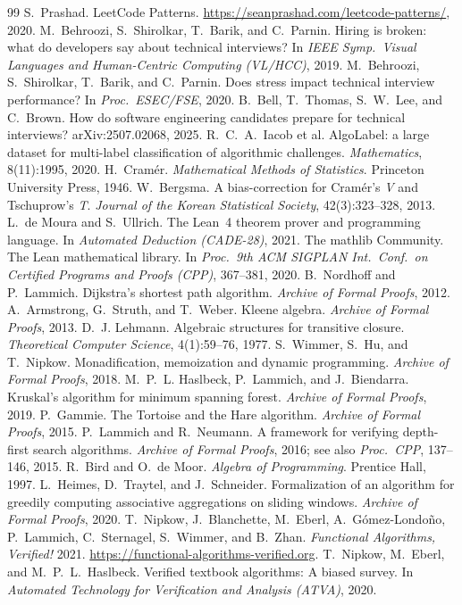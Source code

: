 \documentclass[11pt]{article}
\begin{document}
\begin{thebibliography}{99}
 S.~Prashad. LeetCode Patterns. \url{https://seanprashad.com/leetcode-patterns/}, 2020.
 M.~Behroozi, S.~Shirolkar, T.~Barik, and C.~Parnin. Hiring is broken:
what do developers say about technical interviews? In \emph{IEEE Symp.\ Visual Languages and
Human-Centric Computing (VL/HCC)}, 2019.
 M.~Behroozi, S.~Shirolkar, T.~Barik, and C.~Parnin. Does stress impact
technical interview performance? In \emph{Proc.\ ESEC/FSE}, 2020.
 B.~Bell, T.~Thomas, S.~W.~Lee, and C.~Brown. How do software engineering
candidates prepare for technical interviews? arXiv:2507.02068, 2025.
 R.~C.~A.~Iacob et al. AlgoLabel: a large dataset for multi-label
classification of algorithmic challenges. \emph{Mathematics}, 8(11):1995, 2020.
 H.~Cram\'er. \emph{Mathematical Methods of Statistics}. Princeton
University Press, 1946.
 W.~Bergsma. A bias-correction for Cram\'er's \emph{V} and Tschuprow's
\emph{T}. \emph{Journal of the Korean Statistical Society}, 42(3):323--328, 2013.
 L.~de Moura and S.~Ullrich. The Lean~4 theorem prover and programming
language. In \emph{Automated Deduction (CADE-28)}, 2021.
 The mathlib Community. The Lean mathematical library. In \emph{Proc.\
9th ACM SIGPLAN Int.\ Conf.\ on Certified Programs and Proofs (CPP)}, 367--381, 2020.
\bibitem{afp_dijkstra} B.~Nordhoff and P.~Lammich. Dijkstra's shortest path algorithm.
\emph{Archive of Formal Proofs}, 2012.
 A.~Armstrong, G.~Struth, and T.~Weber. Kleene algebra.
\emph{Archive of Formal Proofs}, 2013.
 D.~J. Lehmann. Algebraic structures for transitive closure.
\emph{Theoretical Computer Science}, 4(1):59--76, 1977.
 S.~Wimmer, S.~Hu, and T.~Nipkow. Monadification, memoization and dynamic
programming. \emph{Archive of Formal Proofs}, 2018.
 M.~P.~L. Haslbeck, P.~Lammich, and J.~Biendarra. Kruskal's algorithm for
minimum spanning forest. \emph{Archive of Formal Proofs}, 2019.
 P.~Gammie. The Tortoise and the Hare algorithm. \emph{Archive of
Formal Proofs}, 2015.
 P.~Lammich and R.~Neumann. A framework for verifying depth-first search
algorithms. \emph{Archive of Formal Proofs}, 2016; see also \emph{Proc.\ CPP}, 137--146, 2015.
\bibitem{bird-demoor} R.~Bird and O.~de Moor. \emph{Algebra of Programming}. Prentice Hall, 1997.
\bibitem{afp_sliding} L.~Heimes, D.~Traytel, and J.~Schneider. Formalization of an algorithm for
greedily computing associative aggregations on sliding windows. \emph{Archive of Formal Proofs}, 2020.
\bibitem{fav_book} T.~Nipkow, J.~Blanchette, M.~Eberl, A.~G\'omez-Londo\~no, P.~Lammich,
C.~Sternagel, S.~Wimmer, and B.~Zhan. \emph{Functional Algorithms, Verified!} 2021.
\url{https://functional-algorithms-verified.org}.
 T.~Nipkow, M.~Eberl, and M.~P.~L.~Haslbeck. Verified textbook algorithms:
A biased survey. In \emph{Automated Technology for Verification and Analysis (ATVA)}, 2020.
\end{thebibliography}
\end{document}
